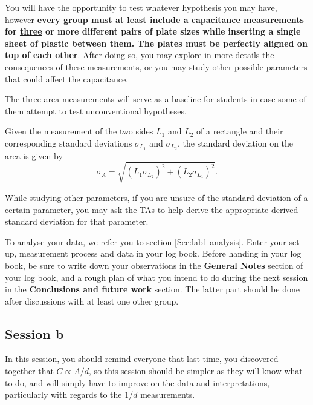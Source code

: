 \documentclass[12pt]{report}
\begin{document}
You will have the opportunity to test whatever hypothesis you may have, however \textbf{every group must at least include a capacitance measurements for \underline{three} or more different pairs of plate sizes while inserting a single sheet of plastic between them. 
The plates must be perfectly aligned on top of each other}. After doing so, you may explore in more details the consequences of these measurements, or you may study other possible parameters that could affect the capacitance.

\begin{tcolorbox}
The three area measurements will serve as a baseline for students in case some of them attempt to test unconventional hypotheses. 
\end{tcolorbox}

Given the measurement of the two sides $L_1$ and $L_2$ of a rectangle and their corresponding standard deviations $\sigma_{L_1}$ and $\sigma_{L_2}$, the standard deviation on the area is given by
\begin{equation}
\sigma_A = \sqrt{ \left( L_1 \sigma_{L_2} \right)^2 + \left( L_2 \sigma_{L_1} \right)^2 }.
\end{equation}

While studying other parameters, if you are unsure of the standard deviation of a certain parameter, you may ask the TAs to help derive the appropriate derived standard deviation for that parameter.

To analyse your data, we refer you to section \ref{Sec:lab1-analysis}.
{\color{blue}Enter your set up, measurement process and data in your log book.} Before handing in your log book, be sure to write down your {\color{blue}observations in the \textbf{General Notes} section of your log book, and a rough plan of what you intend to do during the next session in the \textbf{Conclusions and future work} section}. The latter part should be done after discussions with at least one other group.

\subsection{Session b}

\begin{tcolorbox}[title=Session \#2]
In this session, you should remind everyone that last time, you discovered together that $C \propto A/d$, so this session should be simpler as they will know what to do, and will simply have to improve on the data and interpretations, particularly with regards to the $1/d$ measurements.
\end{tcolorbox}
\end{document}
